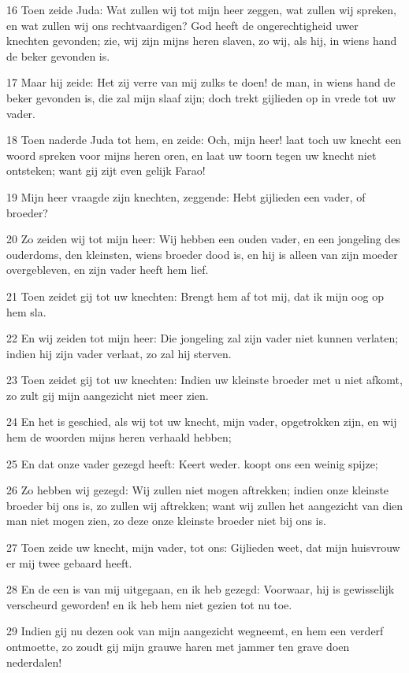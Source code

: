 \par 16 Toen zeide Juda: Wat zullen wij tot mijn heer zeggen, wat zullen wij spreken, en wat zullen wij ons rechtvaardigen? God heeft de ongerechtigheid uwer knechten gevonden; zie, wij zijn mijns heren slaven, zo wij, als hij, in wiens hand de beker gevonden is.
\par 17 Maar hij zeide: Het zij verre van mij zulks te doen! de man, in wiens hand de beker gevonden is, die zal mijn slaaf zijn; doch trekt gijlieden op in vrede tot uw vader.
\par 18 Toen naderde Juda tot hem, en zeide: Och, mijn heer! laat toch uw knecht een woord spreken voor mijns heren oren, en laat uw toorn tegen uw knecht niet ontsteken; want gij zijt even gelijk Farao!
\par 19 Mijn heer vraagde zijn knechten, zeggende: Hebt gijlieden een vader, of broeder?
\par 20 Zo zeiden wij tot mijn heer: Wij hebben een ouden vader, en een jongeling des ouderdoms, den kleinsten, wiens broeder dood is, en hij is alleen van zijn moeder overgebleven, en zijn vader heeft hem lief.
\par 21 Toen zeidet gij tot uw knechten: Brengt hem af tot mij, dat ik mijn oog op hem sla.
\par 22 En wij zeiden tot mijn heer: Die jongeling zal zijn vader niet kunnen verlaten; indien hij zijn vader verlaat, zo zal hij sterven.
\par 23 Toen zeidet gij tot uw knechten: Indien uw kleinste broeder met u niet afkomt, zo zult gij mijn aangezicht niet meer zien.
\par 24 En het is geschied, als wij tot uw knecht, mijn vader, opgetrokken zijn, en wij hem de woorden mijns heren verhaald hebben;
\par 25 En dat onze vader gezegd heeft: Keert weder. koopt ons een weinig spijze;
\par 26 Zo hebben wij gezegd: Wij zullen niet mogen aftrekken; indien onze kleinste broeder bij ons is, zo zullen wij aftrekken; want wij zullen het aangezicht van dien man niet mogen zien, zo deze onze kleinste broeder niet bij ons is.
\par 27 Toen zeide uw knecht, mijn vader, tot ons: Gijlieden weet, dat mijn huisvrouw er mij twee gebaard heeft.
\par 28 En de een is van mij uitgegaan, en ik heb gezegd: Voorwaar, hij is gewisselijk verscheurd geworden! en ik heb hem niet gezien tot nu toe.
\par 29 Indien gij nu dezen ook van mijn aangezicht wegneemt, en hem een verderf ontmoette, zo zoudt gij mijn grauwe haren met jammer ten grave doen nederdalen!
